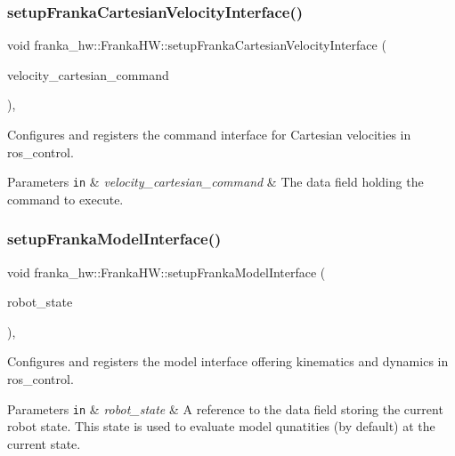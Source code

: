\subsubsection{\texorpdfstring{setup\+Franka\+Cartesian\+Velocity\+Interface()}{setupFrankaCartesianVelocityInterface()}}
{\footnotesize\ttfamily void franka\+\_\+hw\+::\+Franka\+H\+W\+::setup\+Franka\+Cartesian\+Velocity\+Interface (\begin{DoxyParamCaption}\item[{franka\+::\+Cartesian\+Velocities \&}]{velocity\+\_\+cartesian\+\_\+command }\end{DoxyParamCaption})\hspace{0.3cm}{\ttfamily [protected]}, {\ttfamily [virtual]}}

Configures and registers the command interface for Cartesian velocities in ros\+\_\+control.


\begin{DoxyParams}[1]{Parameters}
\mbox{\tt in}  & {\em velocity\+\_\+cartesian\+\_\+command} & The data field holding the command to execute. \\
\hline
\end{DoxyParams}
\mbox{\label{classfranka__hw_1_1_franka_h_w_a4d738b3573b7ab159209b7e2e0d4a802}} 
\subsubsection{\texorpdfstring{setup\+Franka\+Model\+Interface()}{setupFrankaModelInterface()}}
{\footnotesize\ttfamily void franka\+\_\+hw\+::\+Franka\+H\+W\+::setup\+Franka\+Model\+Interface (\begin{DoxyParamCaption}\item[{franka\+::\+Robot\+State \&}]{robot\+\_\+state }\end{DoxyParamCaption})\hspace{0.3cm}{\ttfamily [protected]}, {\ttfamily [virtual]}}

Configures and registers the model interface offering kinematics and dynamics in ros\+\_\+control.


\begin{DoxyParams}[1]{Parameters}
\mbox{\tt in}  & {\em robot\+\_\+state} & A reference to the data field storing the current robot state. This state is used to evaluate model qunatities (by default) at the current state. \\
\hline
\end{DoxyParams}
\mbox{\label{classfranka__hw_1_1_franka_h_w_a4dbc96ed57e3054db31bbab11a61afec}} 

